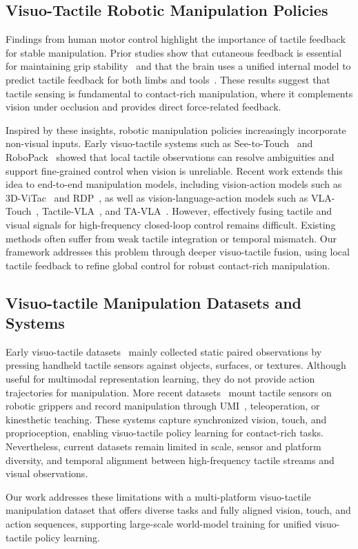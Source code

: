 \subsection{Visuo-Tactile Robotic Manipulation Policies}
Findings from human motor control highlight the importance of tactile feedback for stable manipulation. Prior studies show that cutaneous feedback is essential for maintaining grip stability~\cite{augurelle2003importance} and that the brain uses a unified internal model to predict tactile feedback for both limbs and tools~\cite{kilteni2017sensorimotor, wolpert2001motor}. These results suggest that tactile sensing is fundamental to contact-rich manipulation, where it complements vision under occlusion and provides direct force-related feedback.

Inspired by these insights, robotic manipulation policies increasingly incorporate non-visual inputs. Early visuo-tactile systems such as See-to-Touch~\cite{guzey2024see} and RoboPack~\cite{ai2024robopack} showed that local tactile observations can resolve ambiguities and support fine-grained control when vision is unreliable. Recent work extends this idea to end-to-end manipulation models, including vision-action models such as 3D-ViTac~\cite{huang20243d} and RDP~\cite{xue2025reactive}, as well as vision-language-action models such as VLA-Touch~\cite{bi2025vla}, Tactile-VLA~\cite{huang2025tactile}, and TA-VLA~\cite{zhang2025ta}. However, effectively fusing tactile and visual signals for high-frequency closed-loop control remains difficult. Existing methods often suffer from weak tactile integration or temporal mismatch. Our framework addresses this problem through deeper visuo-tactile fusion, using local tactile feedback to refine global control for robust contact-rich manipulation.

\subsection{Visuo-tactile Manipulation Datasets and Systems}
Early visuo-tactile datasets~\cite{yang2024binding,fu2024touch,yu2024octopi,feng2025anytouch,xie2025universal,yu2025demonstrating} mainly collected static paired observations by pressing handheld tactile sensors against objects, surfaces, or textures. Although useful for multimodal representation learning, they do not provide action trajectories for manipulation. More recent datasets~\cite{li2022see,fang2023rh20t,wu2025freetacman,bi2025vla,cheng2025omnivtla,xu2025exumi,liu2025mla} mount tactile sensors on robotic grippers and record manipulation through UMI~\cite{chi2024universal}, teleoperation, or kinesthetic teaching. These systems capture synchronized vision, touch, and proprioception, enabling visuo-tactile policy learning for contact-rich tasks. Nevertheless, current datasets remain limited in scale, sensor and platform diversity, and temporal alignment between high-frequency tactile streams and visual observations.

Our work addresses these limitations with a multi-platform visuo-tactile manipulation dataset that offers diverse tasks and fully aligned vision, touch, and action sequences, supporting large-scale world-model training for unified visuo-tactile policy learning.

